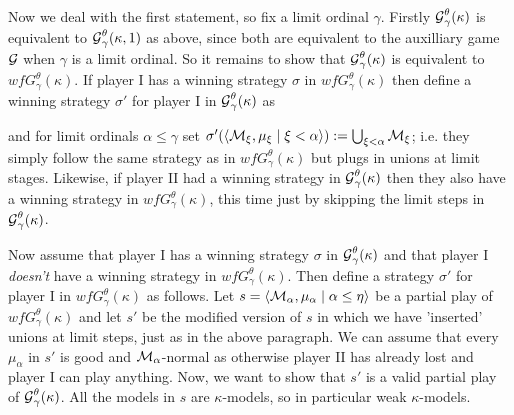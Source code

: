 \documentclass[../main]{subfiles}
\begin{document}
{	\qquad Now we deal with the first statement, so fix a limit ordinal $\gamma$. Firstly $\operatorname{\mathcal G}_\gamma^\theta(\kappa)$ is equivalent to $\operatorname{\mathcal G}_\gamma^\theta(\kappa,1)$ as above, since both are equivalent to the auxilliary game $\operatorname{\mathcal G}$ when $\gamma$ is a limit ordinal. So it remains to show that $\operatorname{\mathcal G}_\gamma^\theta(\kappa)$ is equivalent to $wfG_\gamma^\theta(\kappa)$. If player I has a winning strategy $\sigma$ in $wfG_\gamma^\theta(\kappa)$ then define a winning strategy $\sigma'$ for player I in $\operatorname{\mathcal G}_\gamma^\theta(\kappa)$ as

	and for limit ordinals $\alpha\leq\gamma$ set $\sigma'(\langle \operatorname{\mathcal M}_\xi,\mu_\xi\mid\xi<\alpha\rangle):=\bigcup_{\xi<\alpha}\operatorname{\mathcal M}_\xi$; i.e. they simply follow the same strategy as in $wfG_\gamma^\theta(\kappa)$ but plugs in unions at limit stages. Likewise, if player II had a winning strategy in $\operatorname{\mathcal G}_\gamma^\theta(\kappa)$ then they also have a winning strategy in $wfG_\gamma^\theta(\kappa)$, this time just by skipping the limit steps in $\operatorname{\mathcal G}_\gamma^\theta(\kappa)$.

	\qquad Now assume that player I has a winning strategy $\sigma$ in $\operatorname{\mathcal G}_\gamma^\theta(\kappa)$ and that player I \textit{doesn't} have a winning strategy in $wfG_\gamma^\theta(\kappa)$. Then define a strategy $\sigma'$ for player I in $wfG_\gamma^\theta(\kappa)$ as follows. Let $s=\langle \operatorname{\mathcal M}_\alpha,\mu_\alpha\mid\alpha\leq\eta\rangle$ be a partial play of $wfG_\gamma^\theta(\kappa)$ and let $s'$ be the modified version of $s$ in which we have 'inserted' unions at limit steps, just as in the above paragraph. We can assume that every $\mu_\alpha$ in $s'$ is good and $\operatorname{\mathcal M}_\alpha$-normal as otherwise player II has already lost and player I can play anything. Now, we want to show that $s'$ is a valid partial play of $\operatorname{\mathcal G}_\gamma^\theta(\kappa)$. All the models in $s$ are $\kappa$-models, so in particular weak $\kappa$-models.
	
	
	}
\end{document}
